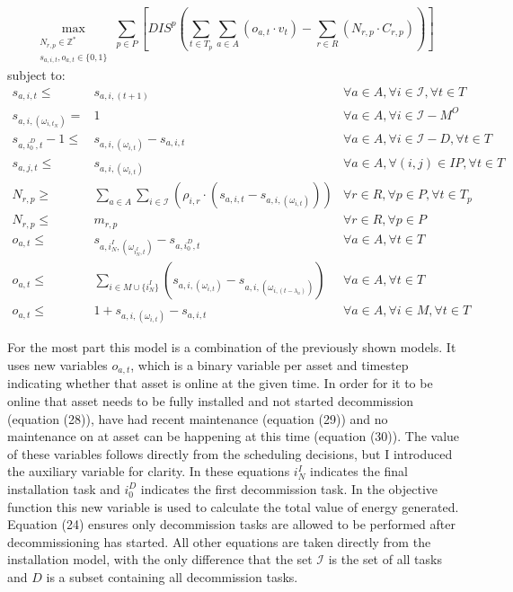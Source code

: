 \documentclass[a4paper,12pt]{article}
\begin{document}
\small
\begin{equation}
	\max_{\substack{N_{r,p} \in \mathbb{Z}^* \\ 
	s_{a,i,t}, o_{a,t} \in \{0, 1\}}} 
	\sum_{p \in P} [ DIS^p (\sum_{t\in T_p} \sum_{a \in A} (o_{a,t} \cdot v_t)  - \sum_{r\in R} (N_{r,p} \cdot C_{r,p})) ]
\end{equation}
subject to:
\begin{align}
s_{a,i,t} \leq& s_{a,i,(t+1)}															& \forall a \in A, \forall i \in \mathcal{I}, \forall t \in T		\\
s_{a,i,(\omega_{i,t_N})} =& 1															& \forall a \in A, \forall i \in \mathcal{I} - M^O			\\
s_{a,i^D_0,t} - 1 \leq& s_{a,i,(\omega_{i,t})} - s_{a,i,t}											& \forall a \in A, \forall i \in \mathcal{I} - D, \forall t \in T	\\
s_{a,j,t} \leq& s_{a,i,(\omega_{i,t})}														& \forall a \in A, \forall (i, j) \in IP, \forall t \in T 		\\
N_{r,p} \geq& \sum_{a\in A} \sum_{i\in \mathcal{I}} (\rho_{i,r} \cdot (s_{a,i,t} - s_{a,i,(\omega_{i,t})})) 				& \forall r \in R, \forall p \in P, \forall t \in T_p 			\\
N_{r,p} \leq& m_{r,p}																& \forall r \in R, \forall p \in P 					\\
o_{a,t} \leq& s_{a,i^I_N,(\omega_{i^I_N,t})} - s_{a,i^D_0,t}										& \forall a \in A, \forall t \in T					\\
o_{a,t} \leq& \sum_{i \in M \cup \{i^I_N\}} (s_{a,i,(\omega_{i,t})} - s_{a,i,(\omega_{i,(t-\lambda_a)})})				& \forall a \in A, \forall t \in T					\\
o_{a,t} \leq& 1 + s_{a,i,(\omega_{i,t})} - s_{a,i,t}												& \forall a \in A, \forall i \in M, \forall t \in T			
\end{align}
\normalsize

For the most part this model is a combination of the previously shown models. It uses new variables $o_{a,t}$, which is a binary variable per asset and timestep indicating whether that asset is online at the given time. In order for it to be online that asset needs to be fully installed and not started decommission (equation (28)), have had recent maintenance (equation (29)) and no maintenance on at asset can be happening at this time (equation (30)). The value of these variables follows directly from the scheduling decisions, but I introduced the auxiliary variable for clarity. In these equations $i^I_N$ indicates the final installation task and $i^D_0$ indicates the first decommission task. In the objective function this new variable is used to calculate the total value of energy generated. Equation (24) ensures only decommission tasks are allowed to be performed after decommissioning has started. All other equations are taken directly from the installation model, with the only difference that the set $\mathcal{I}$ is the set of all tasks and $D$ is a subset containing all decommission tasks. 
\end{document}
